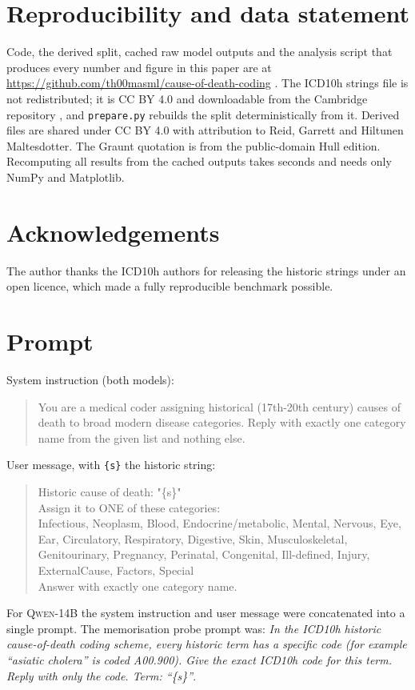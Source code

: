 \documentclass[11pt]{article}
\newcommand{\Mlocal}{\textsc{Qwen-14B}}
\begin{document}
\section*{Reproducibility and data statement}

Code, the derived split, cached raw model outputs and the analysis script that produces every number and figure in this paper are at \url{https://github.com/th00masml/cause-of-death-coding} \citep{nawara2026repo}. The ICD10h strings file is not redistributed; it is CC BY 4.0 and downloadable from the Cambridge repository \citep{reid2024icd10h}, and \texttt{prepare.py} rebuilds the split deterministically from it. Derived files are shared under CC BY 4.0 with attribution to Reid, Garrett and Hiltunen Maltesdotter. The Graunt quotation is from the public-domain Hull edition. Recomputing all results from the cached outputs takes seconds and needs only NumPy and Matplotlib.

\section*{Acknowledgements}

The author thanks the ICD10h authors for releasing the historic strings under an open licence, which made a fully reproducible benchmark possible.




\appendix

\section{Prompt}
\label{app:prompt}

System instruction (both models):
\begin{quote}\small\ttfamily\raggedright\sloppy
You are a medical coder assigning historical (17th-20th century) causes of death to broad modern disease categories. Reply with exactly one category name from the given list and nothing else.
\end{quote}
User message, with \texttt{\{s\}} the historic string:
\begin{quote}\small\ttfamily\raggedright\sloppy
Historic cause of death: "\{s\}"\\[2pt]
Assign it to ONE of these categories:\\
Infectious, Neoplasm, Blood, Endocrine/metabolic, Mental, Nervous, Eye, Ear, Circulatory, Respiratory, Digestive, Skin, Musculoskeletal, Genitourinary, Pregnancy, Perinatal, Congenital, Ill-defined, Injury, ExternalCause, Factors, Special\\[2pt]
Answer with exactly one category name.
\end{quote}
For \Mlocal{} the system instruction and user message were concatenated into a single prompt. The memorisation probe prompt was: \emph{In the ICD10h historic cause-of-death coding scheme, every historic term has a specific code (for example ``asiatic cholera'' is coded A00.900). Give the exact ICD10h code for this term. Reply with only the code. Term: ``\{s\}''}.
\end{document}
